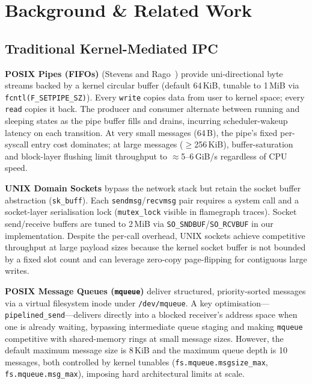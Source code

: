 \documentclass[10pt,conference]{IEEEtran}
\begin{document}
\section{Background \& Related Work}

\subsection{Traditional Kernel-Mediated IPC}

\textbf{POSIX Pipes (FIFOs)} (Stevens and Rago~\cite{stevens2013}) provide uni-directional byte streams backed by a
kernel circular buffer (default 64\,KiB, tunable to 1\,MiB via
\texttt{fcntl(F\_SETPIPE\_SZ)}).  Every \texttt{write} copies data from user
to kernel space; every \texttt{read} copies it back.  The producer and consumer
alternate between running and sleeping states as the pipe buffer fills and
drains, incurring scheduler-wakeup latency on each transition.  At very small
messages (64\,B), the pipe's fixed per-syscall entry cost dominates; at large
messages ($\geq$256\,KiB), buffer-saturation and block-layer flushing limit
throughput to $\approx$5--6\,GiB/s regardless of CPU speed.

\textbf{UNIX Domain Sockets} bypass the network stack but retain the socket
buffer abstraction (\texttt{sk\_buff}).  Each \texttt{sendmsg}/\texttt{recvmsg}
pair requires a system call and a socket-layer serialisation lock
(\texttt{mutex\_lock} visible in flamegraph traces).  Socket send/receive
buffers are tuned to 2\,MiB via \texttt{SO\_SNDBUF}/\texttt{SO\_RCVBUF} in
our implementation.  Despite the per-call overhead, UNIX sockets achieve
competitive throughput at large payload sizes because the kernel socket buffer
is not bounded by a fixed slot count and can leverage zero-copy page-flipping
for contiguous large writes.

\textbf{POSIX Message Queues (\texttt{mqueue})} deliver structured,
priority-sorted messages via a virtual filesystem inode under
\texttt{/dev/mqueue}.  A key optimisation---\texttt{pipelined\_send}---delivers
directly into a blocked receiver's address space when one is already waiting,
bypassing intermediate queue staging and making \texttt{mqueue} competitive
with shared-memory rings at small message sizes.  However, the default maximum
message size is 8\,KiB and the maximum queue depth is 10 messages, both
controlled by kernel tunables (\texttt{fs.mqueue.msgsize\_max},
\texttt{fs.mqueue.msg\_max}), imposing hard architectural limits at scale.
\end{document}
